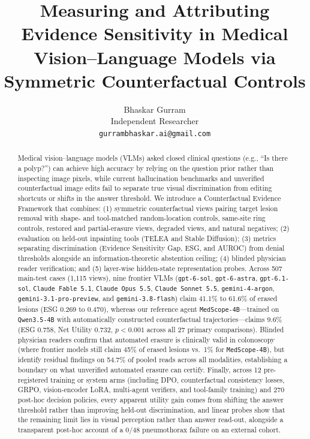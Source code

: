 \documentclass{article} %
\title{Measuring and Attributing Evidence Sensitivity in Medical Vision--Language Models via Symmetric Counterfactual Controls}
\author{Bhaskar Gurram\\
Independent Researcher\\
\texttt{gurrambhaskar.ai@gmail.com}
}
\begin{document}
\maketitle

\begin{abstract}
Medical vision--language models (VLMs) asked closed clinical questions (e.g., ``Is there a polyp?'') can achieve high accuracy by relying on the question prior rather than inspecting image pixels, while current hallucination benchmarks and unverified counterfactual image edits fail to separate true visual discrimination from editing shortcuts or shifts in the answer threshold. We introduce a Counterfactual Evidence Framework that combines: (1) symmetric counterfactual views pairing target lesion removal with shape- and tool-matched random-location controls, same-site ring controls, restored and partial-erasure views, degraded views, and natural negatives; (2) evaluation on held-out inpainting tools (TELEA and Stable Diffusion); (3) metrics separating discrimination (Evidence Sensitivity Gap, ESG, and AUROC) from denial thresholds alongside an information-theoretic abstention ceiling; (4) blinded physician reader verification; and (5) layer-wise hidden-state representation probes. Across 507 main-test cases (1,115 views), nine frontier VLMs (\texttt{gpt-6-sol}, \texttt{gpt-6-astra}, \texttt{gpt-6.1-sol}, \texttt{Claude Fable 5.1}, \texttt{Claude Opus 5.5}, \texttt{Claude Sonnet 5.5}, \texttt{gemini-4-argon}, \texttt{gemini-3.1-pro-preview}, and \texttt{gemini-3.8-flash}) claim 41.1\% to 61.6\% of erased lesions (ESG 0.269 to 0.470), whereas our reference agent \texttt{MedScope-4B}---trained on \texttt{Qwen3.5-4B} with automatically constructed counterfactual trajectories---claims 9.6\% (ESG 0.758, Net Utility 0.732, $p < 0.001$ across all 27 primary comparisons). Blinded physician readers confirm that automated erasure is clinically valid in colonoscopy (where frontier models still claim 45\% of erased lesions vs.\ 1\% for \texttt{MedScope-4B}), but identify residual findings on 54.7\% of pooled reads across all modalities, establishing a boundary on what unverified automated erasure can certify. Finally, across 12 pre-registered training or system arms (including DPO, counterfactual consistency losses, GRPO, vision-encoder LoRA, multi-agent verifiers, and tool-family training) and 270 post-hoc decision policies, every apparent utility gain comes from shifting the answer threshold rather than improving held-out discrimination, and linear probes show that the remaining limit lies in visual perception rather than answer read-out, alongside a transparent post-hoc account of a 0/48 pneumothorax failure on an external cohort.
\end{abstract}
\end{document}
